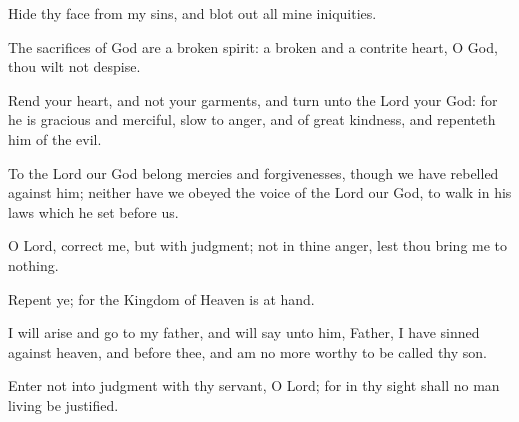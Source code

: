 \begin{multicols}{2}
    Hide thy face from my sins, and blot out all mine iniquities.\par

    The sacrifices of God are a broken spirit: a broken and a contrite heart, O God, thou wilt not despise.\par

    Rend your heart, and not your garments, and turn unto the Lord your God: for he is gracious and merciful, slow to anger, and of great kindness, and repenteth him of the evil.\par

    To the Lord our God belong mercies and forgivenesses, though we have rebelled against him; neither have we obeyed the voice of the Lord our God, to walk in his laws which he set before us.\par

    O Lord, correct me, but with judgment; not in thine anger, lest thou bring me to nothing.\par

    Repent ye; for the Kingdom of Heaven is at hand.\par

    I will arise and go to my father, and will say unto him, Father, I have sinned against heaven, and before thee, and am no more worthy to be called thy son.\par

    Enter not into judgment with thy servant, O Lord; for in thy sight shall no man living be justified.\par


\end{multicols}
